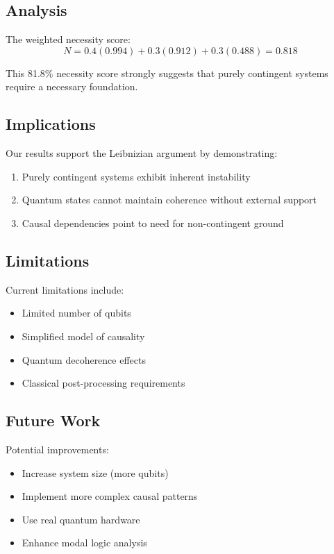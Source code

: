 \subsection{Analysis}

The weighted necessity score:
\begin{equation}
    N = 0.4(0.994) + 0.3(0.912) + 0.3(0.488) = 0.818
\end{equation}

This 81.8\% necessity score strongly suggests that purely contingent systems require a necessary foundation.

\subsection{Implications}

Our results support the Leibnizian argument by demonstrating:

\begin{enumerate}
    \item Purely contingent systems exhibit inherent instability
    \item Quantum states cannot maintain coherence without external support
    \item Causal dependencies point to need for non-contingent ground
\end{enumerate}

\subsection{Limitations}

Current limitations include:
\begin{itemize}
    \item Limited number of qubits
    \item Simplified model of causality
    \item Quantum decoherence effects
    \item Classical post-processing requirements
\end{itemize}

\subsection{Future Work}

Potential improvements:
\begin{itemize}
    \item Increase system size (more qubits)
    \item Implement more complex causal patterns
    \item Use real quantum hardware
    \item Enhance modal logic analysis
\end{itemize}